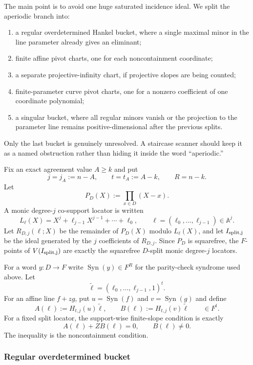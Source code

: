 \documentclass[11pt]{article}
\theoremstyle{definition}
\theoremstyle{remark}
\newcommand{\Syn}{\operatorname{Syn}}
\begin{document}
The main point is to avoid one huge saturated incidence ideal.  We split the
aperiodic branch into:
\begin{enumerate}[label=\textup{(\roman*)},leftmargin=2.2em]
\item a regular overdetermined Hankel bucket, where a single maximal minor in the
line parameter already gives an eliminant;
\item finite affine pivot charts, one for each noncontainment coordinate;
\item a separate projective-infinity chart, if projective slopes are being
counted;
\item finite-parameter curve pivot charts, one for a nonzero coefficient of one
coordinate polynomial;
\item a singular bucket, where all regular minors vanish or the projection to the
parameter line remains positive-dimensional after the previous splits.
\end{enumerate}
Only the last bucket is genuinely unresolved.  A staircase scanner should keep it
as a named obstruction rather than hiding it inside the word ``aperiodic.''

Fix an exact agreement value $A\ge k$ and put
\[
        j=j_A:=n-A,
        \qquad
        t=t_A:=A-k,
        \qquad
        R=n-k .
\]
Let
\[
        P_D(X):=\prod_{x\in D}(X-x).
\]
A monic degree-$j$ co-support locator is written
\[
        L_{\ell}(X)=X^j+\ell_{j-1}X^{j-1}+\cdots+\ell_0,
        \qquad \ell=(\ell_0,\ldots,\ell_{j-1})\in\mathbb A^j .
\]
Let $R_{D,j}(\ell;X)$ be the remainder of $P_D(X)$ modulo $L_{\ell}(X)$, and let
$I_{\rm split,j}$ be the ideal generated by the $j$ coefficients of
$R_{D,j}$.  Since $P_D$ is squarefree, the $F$-points of
$V(I_{\rm split,j})$ are exactly the squarefree $D$-split monic degree-$j$
locators.

For a word $y:D\to F$ write $\Syn(y)\in F^R$ for the parity-check syndrome used
above.  Let
\[
        \widetilde\ell=(\ell_0,\ldots,\ell_{j-1},1)^t .
\]
For an affine line $f+zg$, put $u=\Syn(f)$ and $v=\Syn(g)$ and define
\[
        A(\ell):=H_{t,j}(u)\widetilde\ell,
        \qquad
        B(\ell):=H_{t,j}(v)\widetilde\ell
        \qquad\in F^t .
\]
For a fixed split locator, the support-wise finite-slope condition is exactly
\[
        A(\ell)+ZB(\ell)=0,
        \qquad
        B(\ell)\ne0 .
\]
The inequality is the noncontainment condition.

\subsubsection{Regular overdetermined bucket}
\end{document}
